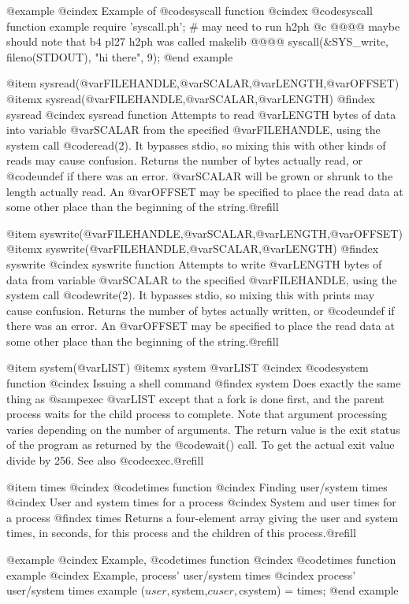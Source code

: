 {{{{{{{@example
@cindex Example of @code{syscall} function
@cindex @code{syscall} function example
require 'syscall.ph';         # may need to run h2ph
@c @@@@ maybe should note that b4 pl27 h2ph was called makelib @@@@
syscall(&SYS_write, fileno(STDOUT), "hi there\n", 9);
@end example

@item sysread(@var{FILEHANDLE},@var{SCALAR},@var{LENGTH},@var{OFFSET})
@itemx sysread(@var{FILEHANDLE},@var{SCALAR},@var{LENGTH})
@findex sysread
@cindex sysread function
Attempts to read @var{LENGTH} bytes of data into variable @var{SCALAR}
from the specified @var{FILEHANDLE}, using the system call
@code{read(2)}.  It bypasses stdio, so mixing this with other kinds of
reads may cause confusion.  Returns the number of bytes actually read,
or @code{undef} if there was an error.  @var{SCALAR} will be grown or
shrunk to the length actually read.  An @var{OFFSET} may be specified to
place the read data at some other place than the beginning of the
string.@refill

@item syswrite(@var{FILEHANDLE},@var{SCALAR},@var{LENGTH},@var{OFFSET})
@itemx syswrite(@var{FILEHANDLE},@var{SCALAR},@var{LENGTH})
@findex syswrite
@cindex syswrite function
Attempts to write @var{LENGTH} bytes of data from variable @var{SCALAR}
to the specified @var{FILEHANDLE}, using the system call
@code{write(2)}.  It bypasses stdio, so mixing this with prints may
cause confusion.  Returns the number of bytes actually written, or
@code{undef} if there was an error.  An @var{OFFSET} may be specified
to place the read data at some other place than the beginning of the
string.@refill

@item system(@var{LIST})
@itemx system @var{LIST}
@cindex @code{system} function
@cindex Issuing a shell command
@findex system
Does exactly the same thing as @samp{exec @var{LIST}} except that a fork
is done first, and the parent process waits for the child process to
complete.  Note that argument processing varies depending on the number
of arguments.  The return value is the exit status of the program as
returned by the @code{wait()} call.  To get the actual exit value divide
by 256.  See also @code{exec}.@refill

@item times
@cindex @code{times} function
@cindex Finding user/system times
@cindex User and system times for a process
@cindex System and user times for a process
@findex times
Returns a four-element array giving the user and system times, in
seconds, for this process and the children of this process.@refill

@example
@cindex Example, @code{times} function
@cindex @code{times} function example
@cindex Example, process' user/system times
@cindex process' user/system times example
($user,$system,$cuser,$csystem) = times;
@end example

}}}}}}}

